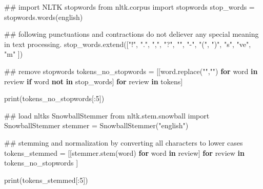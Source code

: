 \documentclass[
  letterpaper,
]{scrbook}
\newenvironment{Shaded}{\begin{snugshade}}{\end{snugshade}}
\newcommand{\BuiltInTok}[1]{\textcolor[rgb]{0.00,0.23,0.31}{#1}}
\newcommand{\CommentTok}[1]{\textcolor[rgb]{0.37,0.37,0.37}{#1}}
\newcommand{\ControlFlowTok}[1]{\textcolor[rgb]{0.00,0.23,0.31}{\textbf{#1}}}
\newcommand{\DecValTok}[1]{\textcolor[rgb]{0.68,0.00,0.00}{#1}}
\newcommand{\ImportTok}[1]{\textcolor[rgb]{0.00,0.46,0.62}{#1}}
\newcommand{\KeywordTok}[1]{\textcolor[rgb]{0.00,0.23,0.31}{\textbf{#1}}}
\newcommand{\NormalTok}[1]{\textcolor[rgb]{0.00,0.23,0.31}{#1}}
\newcommand{\OperatorTok}[1]{\textcolor[rgb]{0.37,0.37,0.37}{#1}}
\newcommand{\StringTok}[1]{\textcolor[rgb]{0.13,0.47,0.30}{#1}}
\begin{document}
\begin{Shaded}
\begin{Highlighting}[]
\CommentTok{\#\# import NLTK stopwords}
\ImportTok{from}\NormalTok{ nltk.corpus }\ImportTok{import}\NormalTok{ stopwords}
\NormalTok{stop\_words }\OperatorTok{=}\NormalTok{ stopwords.words(}\StringTok{\textquotesingle{}english\textquotesingle{}}\NormalTok{)}

\CommentTok{\#\# following punctuations and contractions do not deliever any special meaning in text processing.}
\NormalTok{stop\_words.extend([}\StringTok{"!"}\NormalTok{, }\StringTok{"."}\NormalTok{, }\StringTok{","}\NormalTok{, }\StringTok{"?"}\NormalTok{, }\StringTok{"\textquotesingle{}"}\NormalTok{, }\StringTok{"{-}"}\NormalTok{, }\StringTok{"("}\NormalTok{, }\StringTok{")"}\NormalTok{, }\StringTok{"\textquotesingle{}s"}\NormalTok{, }\StringTok{"\textquotesingle{}ve"}\NormalTok{, }\StringTok{"\textquotesingle{}m"}\NormalTok{ ])}

\CommentTok{\#\# remove stopwords}
\NormalTok{tokens\_no\_stopwords }\OperatorTok{=}\NormalTok{ [[word.replace(}\StringTok{"\textquotesingle{}"}\NormalTok{,}\StringTok{""}\NormalTok{) }\ControlFlowTok{for}\NormalTok{ word }\KeywordTok{in}\NormalTok{ review }\ControlFlowTok{if}\NormalTok{ word }\KeywordTok{not} \KeywordTok{in}\NormalTok{ stop\_words] }\ControlFlowTok{for}\NormalTok{ review }\KeywordTok{in}\NormalTok{ tokens]}

\BuiltInTok{print}\NormalTok{(tokens\_no\_stopwords[:}\DecValTok{5}\NormalTok{])}
\end{Highlighting}
\end{Shaded}

\begin{Shaded}
\begin{Highlighting}[]
\CommentTok{\#\# load nltk\textquotesingle{}s SnowballStemmer}
\ImportTok{from}\NormalTok{ nltk.stem.snowball }\ImportTok{import}\NormalTok{ SnowballStemmer}
\NormalTok{stemmer }\OperatorTok{=}\NormalTok{ SnowballStemmer(}\StringTok{"english"}\NormalTok{)}

\CommentTok{\#\# stemming and normalization by converting all characters to lower cases}
\NormalTok{tokens\_stemmed }\OperatorTok{=}\NormalTok{ [[stemmer.stem(word) }\ControlFlowTok{for}\NormalTok{ word }\KeywordTok{in}\NormalTok{ review] }\ControlFlowTok{for}\NormalTok{ review }\KeywordTok{in}\NormalTok{ tokens\_no\_stopwords ]}

\BuiltInTok{print}\NormalTok{(tokens\_stemmed[:}\DecValTok{5}\NormalTok{])}
\end{Highlighting}
\end{Shaded}
\end{document}

